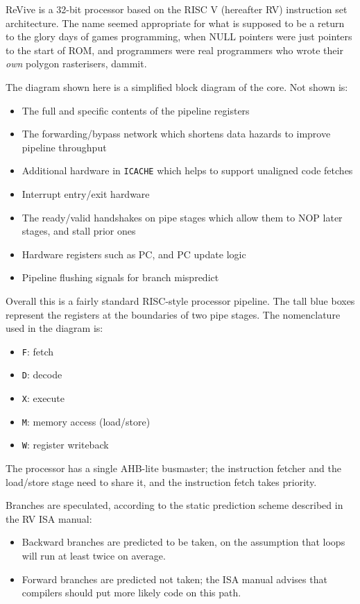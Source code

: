 \documentclass{article}
\begin{document}
ReVive is a 32-bit processor based on the RISC V (hereafter RV) instruction set architecture. The name seemed appropriate for what is supposed to be a return to the glory days of games programming, when NULL pointers were just pointers to the start of ROM, and programmers were real programmers who wrote their \textit{own} polygon rasterisers, dammit.

The diagram shown here is a simplified block diagram of the core. Not shown is:
\begin{itemize}
\item The full and specific contents of the pipeline registers
\item The forwarding/bypass network which shortens data hazards to improve pipeline throughput
\item Additional hardware in \texttt{ICACHE} which helps to support unaligned code fetches
\item Interrupt entry/exit hardware
\item The ready/valid handshakes on pipe stages which allow them to NOP later stages, and stall prior ones
\item Hardware registers such as PC, and PC update logic
\item Pipeline flushing signals for branch mispredict
\end{itemize}

Overall this is a fairly standard RISC-style processor pipeline. The tall blue boxes represent the registers at the boundaries of two pipe stages. The nomenclature used in the diagram is:

\begin{itemize}
\item \texttt{F}: fetch
\item \texttt{D}: decode
\item \texttt{X}: execute
\item \texttt{M}: memory access (load/store)
\item \texttt{W}: register writeback
\end{itemize}

The processor has a single AHB-lite busmaster; the instruction fetcher and the load/store stage need to share it, and the instruction fetch takes priority.

Branches are speculated, according to the static prediction scheme described in the RV ISA manual:

\begin{itemize}
\item Backward branches are predicted to be taken, on the assumption that loops will run at least twice on average.
\item Forward branches are predicted not taken; the ISA manual advises that compilers should put more likely code on this path.
\end{itemize}
\end{document}

